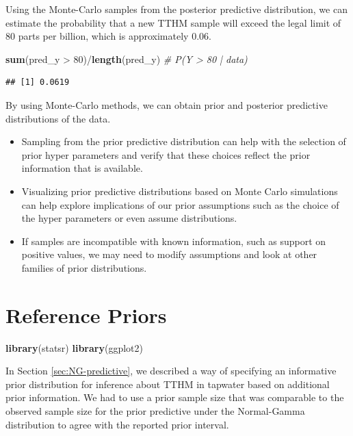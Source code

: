 \documentclass[]{book}
\newenvironment{Shaded}{\begin{snugshade}}{\end{snugshade}}
\newcommand{\KeywordTok}[1]{\textcolor[rgb]{0.13,0.29,0.53}{\textbf{{#1}}}}
\newcommand{\DecValTok}[1]{\textcolor[rgb]{0.00,0.00,0.81}{{#1}}}
\newcommand{\StringTok}[1]{\textcolor[rgb]{0.31,0.60,0.02}{{#1}}}
\newcommand{\CommentTok}[1]{\textcolor[rgb]{0.56,0.35,0.01}{\textit{{#1}}}}
\newcommand{\NormalTok}[1]{{#1}}
\theoremstyle{definition}
\theoremstyle{definition}
\theoremstyle{definition}
\theoremstyle{remark}
\begin{document}
Using the Monte-Carlo samples from the posterior predictive
distribution, we can estimate the probability that a new TTHM sample
will exceed the legal limit of 80 parts per billion, which is
approximately 0.06.

\begin{Shaded}
\begin{Highlighting}[]
\KeywordTok{sum}\NormalTok{(pred_y >}\StringTok{ }\DecValTok{80}\NormalTok{)/}\KeywordTok{length}\NormalTok{(pred_y)  }\CommentTok{# P(Y > 80 | data)}
\end{Highlighting}
\end{Shaded}

\begin{verbatim}
## [1] 0.0619
\end{verbatim}

By using Monte-Carlo methods, we can obtain prior and posterior
predictive distributions of the data.

\begin{itemize}
\item
  Sampling from the prior predictive distribution can help with the
  selection of prior hyper parameters and verify that these choices
  reflect the prior information that is available.
\item
  Visualizing prior predictive distributions based on Monte Carlo
  simulations can help explore implications of our prior assumptions
  such as the choice of the hyper parameters or even assume
  distributions.
\item
  If samples are incompatible with known information, such as support on
  positive values, we may need to modify assumptions and look at other
  families of prior distributions.
\end{itemize}

\section{Reference Priors}\label{sec:NG-reference}

\begin{Shaded}
\begin{Highlighting}[]
\KeywordTok{library}\NormalTok{(statsr)}
\KeywordTok{library}\NormalTok{(ggplot2)}
\end{Highlighting}
\end{Shaded}

In Section \ref{sec:NG-predictive}, we described a way of specifying an
informative prior distribution for inference about TTHM in tapwater
based on additional prior information. We had to use a prior sample size
that was comparable to the observed sample size for the prior predictive
under the Normal-Gamma distribution to agree with the reported prior
interval.
\end{document}
